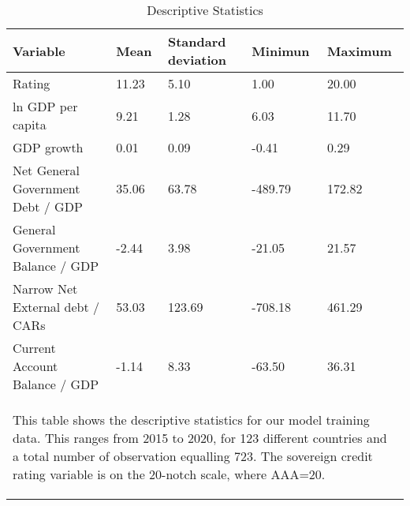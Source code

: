 
\begin{table}[tb!]
\footnotesize
\center
\caption{Descriptive Statistics}
\label{tab:D}
\begin{tabularx}{\textwidth}{p{7cm} X X X X}
\hline
Variable & Mean & Standard deviation & Minimun & Maximum\\
\hline
Rating &  11.23  &  5.10  &  1.00  &  20.00 \\
ln GDP per capita &  9.21  &  1.28  &  6.03  &  11.70 \\
GDP growth &  0.01  &  0.09  &  -0.41  &  0.29 \\
Net General Government Debt / GDP &  35.06  &  63.78  &  -489.79  &  172.82 \\
General Government Balance / GDP &  -2.44  &  3.98  &  -21.05  &  21.57 \\
Narrow Net External debt / CARs &  53.03  &  123.69  &  -708.18  &  461.29 \\
Current Account Balance / GDP &  -1.14  &  8.33  &  -63.50  &  36.31 \\
\hline
\multicolumn{5}{p{\textwidth}}{\begin{footnotesize}This table shows the descriptive statistics for our model training data. This ranges from 2015 to 2020, for 123 different countries and a total number of observation equalling 723. The sovereign credit rating variable is on the 20-notch scale, where AAA=20. 
\end{footnotesize}
}
\end{tabularx}
\end{table}
